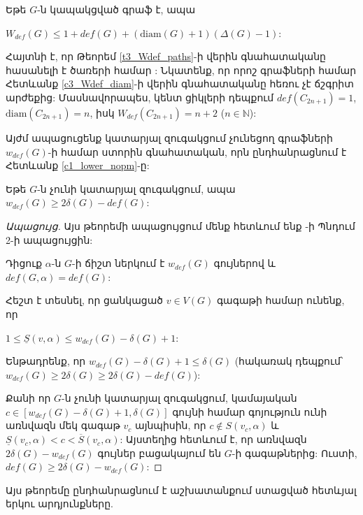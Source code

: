 \begin{corollary}
\label{c3_Wdef_diam} Եթե $G$-ն կապակցված գրաֆ է, ապա
\begin{center}
$W_{def}(G)\leq
1+def(G)+(\mathrm{diam}(G)+1)\left(\Delta(G)-1\right)$:
\end{center}
\end{corollary}

Հայտնի է, որ Թեորեմ \ref{t3_Wdef_paths}-ի վերին գնահատականը հասանելի է ծառերի համար \cite{Kamalian1989,Kamalian1990}: Նկատենք, որ որոշ գրաֆների համար Հետևանք \ref{c3_Wdef_diam}-ի վերին գնահատականը հեռու չէ ճշգրիտ արժեքից: Մասնավորապես, կենտ ցիկլերի դեպքում 
$def\left(C_{2n+1}\right)=1$, $\mathrm{diam}\left(C_{2n+1}\right)=n$,
իսկ $W_{def}\left(C_{2n+1}\right)=n+2$ ($n\in \mathbb{N}$):

Այժմ ապացուցենք կատարյալ զուգակցում չունեցող գրաֆների $w_{def}(G)$-ի համար ստորին գնահատական, որն ընդհանրացնում է Հետևանք \ref{c1_lower_nopm}-ը:

\begin{theorem}
\label{t3_wdef_nopm} Եթե $G$-ն չունի կատարյալ զուգակցում, ապա
$w_{def}(G)\geq 2\delta(G)-def(G)$:
\end{theorem}
\begin{proof}[Ապացույց] Այս թեորեմի ապացույցում մենք հետևում ենք \cite{BouchardHertzDesaulniers}-ի Պնդում 2-ի ապացույցին:

Դիցուք $\alpha$-ն $G$-ի ճիշտ ներկում է $w_{def}(G)$ գույներով և 
$def(G,\alpha)=def(G)$:

Հեշտ է տեսնել, որ ցանկացած $v\in V(G)$ գագաթի համար ունենք, որ

\begin{center}
$1\leq \underline S\left(v,\alpha \right)\leq
w_{def}(G)-\delta(G)+1$:
\end{center}

Ենթադրենք, որ $w_{def}(G)-\delta(G)+1\leq \delta(G)$ (հակառակ դեպքում՝
$w_{def}(G)\geq 2\delta(G)\geq 2\delta(G)-def(G)$):

Քանի որ $G$-ն չունի կատարյալ զուգակցում, կամայական $c\in
\left[w_{def}(G)-\delta(G)+1,\delta(G)\right]$ գույնի համար գոյություն ունի առնվազն մեկ գագաթ $v_{c}$ այնպիսին, որ $c\notin S\left(v_{c},\alpha\right)$
և $\underline S\left(v_{c},\alpha \right)<c<\overline
S\left(v_{c},\alpha \right)$: Այստեղից հետևում է, որ առնվազն
$2\delta(G)-w_{def}(G)$ գույներ բացակայում են $G$-ի գագաթներից: Ուստի,
$def(G)\geq 2\delta(G)-w_{def}(G)$:
\end{proof}

Այս թեորեմը ընդհանրացնում է \cite{BouchardHertzDesaulniers} աշխատանքում ստացված հետևյալ երկու արդյունքները.

